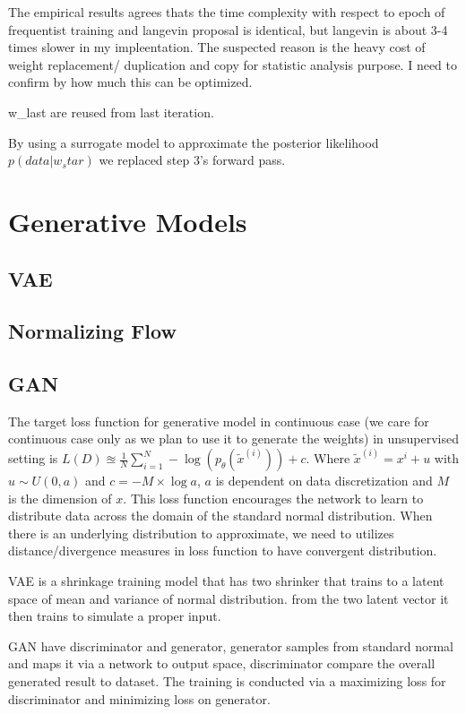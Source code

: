 \documentclass[honours,12pt]{unswthesis}
\numberwithin{equation}{section}
\begin{document}
The empirical results agrees thats the time complexity with respect to epoch of frequentist training and langevin proposal is identical, but langevin is about 3-4 times slower in my impleentation. The suspected reason is the heavy cost of weight replacement/ duplication and copy for statistic analysis purpose. I need to confirm by how much this can be optimized. 

w\_last are reused from last iteration.

By using a surrogate model to approximate the posterior likelihood $p(data|w_star)$ we replaced step 3's forward pass.

\section{Generative Models}
\subsection{VAE}
\subsection{Normalizing Flow}
\subsection{GAN}

The target loss function for generative model in continuous case (we care for continuous case only as we plan to use it to generate the weights) in unsupervised setting is $L(D) \approxeq \frac{1}{N}\sum_{i=1}^N - \log(p_\theta(\tilde{x}^{(i)}))+c$. Where $\tilde{x}^{(i)} = x^{i}+u$ with $u\sim U(0,a)$ and $c=-M\times \log{a}$, $a$ is dependent on data discretization and $M$ is the dimension of $x$. This loss function encourages the network to learn to distribute data across the domain of the standard normal distribution. When there is an underlying distribution to approximate, we need to utilizes distance/divergence measures in loss function to have convergent distribution.

VAE is a shrinkage training model that has two shrinker that trains to a latent space of mean and variance of normal distribution.
from the two latent vector it then trains to simulate a proper input.

GAN have discriminator and generator, generator samples from standard normal and maps it via a network to output space, discriminator compare the overall generated result to dataset. The training is conducted via a maximizing loss for discriminator and minimizing loss on generator.
\end{document}
